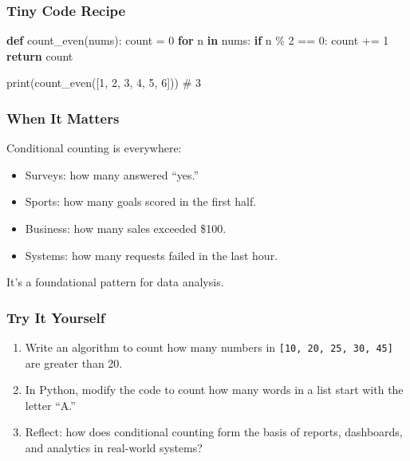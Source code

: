\documentclass[
  letterpaper,
  DIV=11,
  numbers=noendperiod]{scrreprt}
\newenvironment{Shaded}{\begin{snugshade}}{\end{snugshade}}
\newcommand{\BuiltInTok}[1]{\textcolor[rgb]{0.00,0.23,0.31}{#1}}
\newcommand{\CommentTok}[1]{\textcolor[rgb]{0.37,0.37,0.37}{#1}}
\newcommand{\ControlFlowTok}[1]{\textcolor[rgb]{0.00,0.23,0.31}{\textbf{#1}}}
\newcommand{\DecValTok}[1]{\textcolor[rgb]{0.68,0.00,0.00}{#1}}
\newcommand{\KeywordTok}[1]{\textcolor[rgb]{0.00,0.23,0.31}{\textbf{#1}}}
\newcommand{\NormalTok}[1]{\textcolor[rgb]{0.00,0.23,0.31}{#1}}
\newcommand{\OperatorTok}[1]{\textcolor[rgb]{0.37,0.37,0.37}{#1}}
\providecommand{\tightlist}{%
  \setlength{\itemsep}{0pt}\setlength{\parskip}{0pt}}
\begin{document}
\subsubsection{Tiny Code Recipe}\label{tiny-code-recipe-93}

\begin{Shaded}
\begin{Highlighting}[]
\KeywordTok{def}\NormalTok{ count\_even(nums):}
\NormalTok{    count }\OperatorTok{=} \DecValTok{0}
    \ControlFlowTok{for}\NormalTok{ n }\KeywordTok{in}\NormalTok{ nums:}
        \ControlFlowTok{if}\NormalTok{ n }\OperatorTok{\%} \DecValTok{2} \OperatorTok{==} \DecValTok{0}\NormalTok{:}
\NormalTok{            count }\OperatorTok{+=} \DecValTok{1}
    \ControlFlowTok{return}\NormalTok{ count}

\BuiltInTok{print}\NormalTok{(count\_even([}\DecValTok{1}\NormalTok{, }\DecValTok{2}\NormalTok{, }\DecValTok{3}\NormalTok{, }\DecValTok{4}\NormalTok{, }\DecValTok{5}\NormalTok{, }\DecValTok{6}\NormalTok{]))  }\CommentTok{\# 3}
\end{Highlighting}
\end{Shaded}

\subsubsection{When It Matters}\label{when-it-matters-93}

Conditional counting is everywhere:

\begin{itemize}
\tightlist
\item
  Surveys: how many answered ``yes.''
\item
  Sports: how many goals scored in the first half.
\item
  Business: how many sales exceeded \$100.
\item
  Systems: how many requests failed in the last hour.
\end{itemize}

It's a foundational pattern for data analysis.

\subsubsection{Try It Yourself}\label{try-it-yourself-95}

\begin{enumerate}
\def\labelenumi{\arabic{enumi}.}
\tightlist
\item
  Write an algorithm to count how many numbers in
  \texttt{{[}10,\ 20,\ 25,\ 30,\ 45{]}} are greater than 20.
\item
  In Python, modify the code to count how many words in a list start
  with the letter ``A.''
\item
  Reflect: how does conditional counting form the basis of reports,
  dashboards, and analytics in real-world systems?
\end{enumerate}
\end{document}
